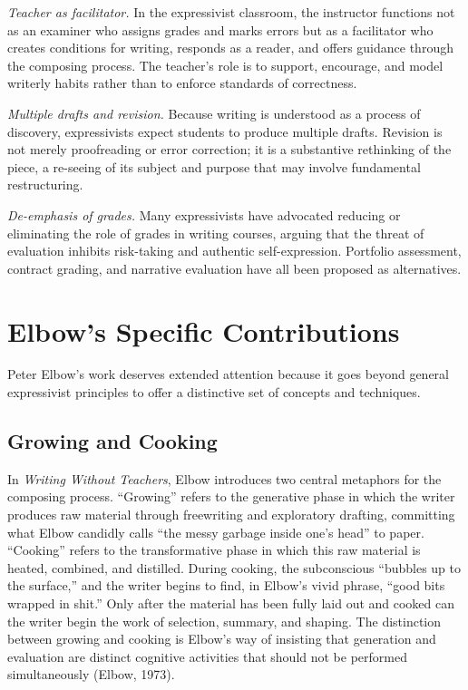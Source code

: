 \documentclass[12pt]{article}
\begin{document}
\textit{Teacher as facilitator.} In the expressivist classroom, the instructor functions not as an examiner who assigns grades and marks errors but as a facilitator who creates conditions for writing, responds as a reader, and offers guidance through the composing process. The teacher's role is to support, encourage, and model writerly habits rather than to enforce standards of correctness.

\textit{Multiple drafts and revision.} Because writing is understood as a process of discovery, expressivists expect students to produce multiple drafts. Revision is not merely proofreading or error correction; it is a substantive rethinking of the piece, a re-seeing of its subject and purpose that may involve fundamental restructuring.

\textit{De-emphasis of grades.} Many expressivists have advocated reducing or eliminating the role of grades in writing courses, arguing that the threat of evaluation inhibits risk-taking and authentic self-expression. Portfolio assessment, contract grading, and narrative evaluation have all been proposed as alternatives.

\section{Elbow's Specific Contributions}

Peter Elbow's work deserves extended attention because it goes beyond general expressivist principles to offer a distinctive set of concepts and techniques.

\subsection{Growing and Cooking}

In \textit{Writing Without Teachers}, Elbow introduces two central metaphors for the composing process. ``Growing'' refers to the generative phase in which the writer produces raw material through freewriting and exploratory drafting, committing what Elbow candidly calls ``the messy garbage inside one's head'' to paper. ``Cooking'' refers to the transformative phase in which this raw material is heated, combined, and distilled. During cooking, the subconscious ``bubbles up to the surface,'' and the writer begins to find, in Elbow's vivid phrase, ``good bits wrapped in shit.'' Only after the material has been fully laid out and cooked can the writer begin the work of selection, summary, and shaping. The distinction between growing and cooking is Elbow's way of insisting that generation and evaluation are distinct cognitive activities that should not be performed simultaneously (Elbow, 1973).
\end{document}
